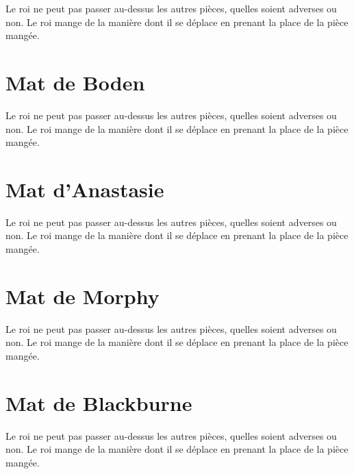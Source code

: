 \documentclass[a5paper,openany,twocolumn]{book}
\begin{document}
{Le roi ne peut pas passer au-dessus les autres pièces, quelles soient adverses ou non. Le roi mange de la manière dont il se déplace en prenant la place de la pièce mangée. 

 
\chapter{Mat de Boden}

Le roi ne peut pas passer au-dessus les autres pièces, quelles soient adverses ou non. Le roi mange de la manière dont il se déplace en prenant la place de la pièce mangée. 

 
\chapter{Mat d'Anastasie}

Le roi ne peut pas passer au-dessus les autres pièces, quelles soient adverses ou non. Le roi mange de la manière dont il se déplace en prenant la place de la pièce mangée. 

 
\chapter{Mat de Morphy}

Le roi ne peut pas passer au-dessus les autres pièces, quelles soient adverses ou non. Le roi mange de la manière dont il se déplace en prenant la place de la pièce mangée. 

 
\chapter{Mat de Blackburne}

Le roi ne peut pas passer au-dessus les autres pièces, quelles soient adverses ou non. Le roi mange de la manière dont il se déplace en prenant la place de la pièce mangée. 

}
\end{document}
